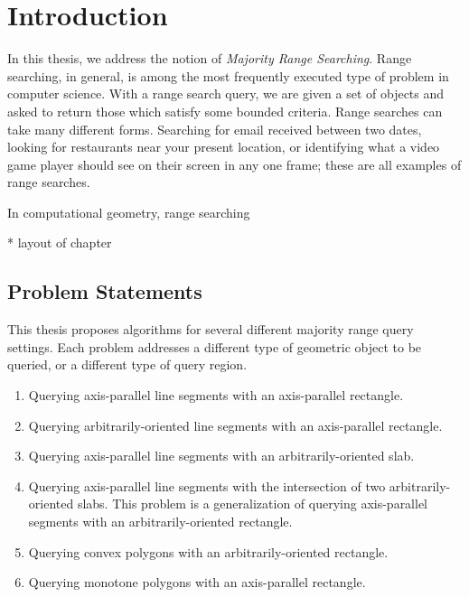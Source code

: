 \chapter{Introduction}
\label{:intro}

In this thesis, we address the notion of \emph{Majority Range Searching}.  Range searching, in general, is among the most frequently executed type of problem in computer science. With a range search query, we are given a set of objects and asked to return those which satisfy some bounded criteria. Range searches can take many different forms. Searching for email received between two dates, looking for restaurants near your present location, or identifying what a video game player should see on their screen in any one frame; these are all examples of range searches.

In computational geometry, range searching 


* layout of chapter


\section{Problem Statements}
\label{:introduction:problems}

This thesis proposes algorithms for several different majority range query settings.  Each problem addresses a different type of geometric object to be queried, or a different type of query region.

\begin{enumerate}
\item Querying axis-parallel line segments with an axis-parallel rectangle.

\item Querying arbitrarily-oriented line segments with an axis-parallel rectangle.

\item Querying axis-parallel line segments with an arbitrarily-oriented slab.

\item Querying axis-parallel line segments with the intersection of two arbitrarily-oriented slabs. This problem is a generalization of querying axis-parallel segments with an arbitrarily-oriented rectangle.

\item Querying convex polygons with an arbitrarily-oriented rectangle.

\item Querying monotone polygons with an axis-parallel rectangle.
\end{enumerate}



